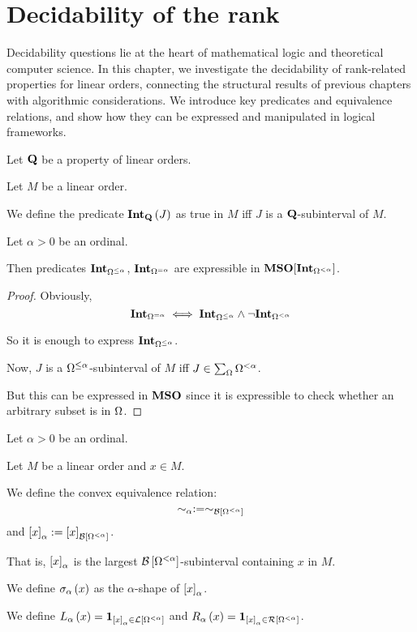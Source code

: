 \section{Decidability of the rank}

Decidability questions lie at the heart of mathematical logic and theoretical computer science. In this chapter, we investigate the decidability of rank-related properties for linear orders, connecting the structural results of previous chapters with algorithmic considerations. We introduce key predicates and equivalence relations, and show how they can be expressed and manipulated in logical frameworks.

\begin{definition}
  Let $\mathbf{Q}$ be a property of linear orders.

  Let $M$ be a linear order.

  We define the predicate $\mathbf{Int}_{\mathbf{Q}} \left( {J} \right)$ as
  true in $M$ iff $J$ is a $\mathbf{Q}$-subinterval of $M$.
\end{definition}

\begin{lemma}
  Let $\alpha > 0$ be an ordinal.

  Then predicates $\mathbf{Int}_{\Omega^{\le \alpha}}$, $\mathbf{Int}_{\Omega^{= \alpha}}$
  are expressible in $\mathbf{MSO}[\mathbf{Int}_{\Omega^{< \alpha}}]$.
\end{lemma}

\begin{proof}
  Obviously, \[
    \mathbf{Int}_{\Omega^{= \alpha}}
    \iff \mathbf{Int}_{\Omega^{\le \alpha}} \wedge \neg \mathbf{Int}_{\Omega^{< \alpha}}
  \]

  So it is enough to express $\mathbf{Int}_{\Omega^{\le \alpha}}$.

  Now, $J$ is a $\Omega^{\le \alpha}$-subinterval of $M$ iff
  $J \in \sum_{\Omega}{\Omega^{< \alpha}}$.

  But this can be expressed in $\mathbf{MSO}$ since it is expressible
  to check whether an arbitrary subset is in $\Omega$.
\end{proof}

\begin{definition}
  Let $\alpha > 0$ be an ordinal.

  Let $M$ be a linear order and $x \in M$.

  We define the convex equivalence relation:
  \[\sim_\alpha := \sim_{\mathcal{B} \left[ {{\Omega^{< \alpha}}} \right]}\]
  and $\left[ {x} \right]_{\alpha} := \left[ {x} \right]_{\mathcal{B} \left[ {{\Omega^{< \alpha}}} \right]}$.

  That is,
  $\left[ {x} \right]_{\alpha}$ is the largest $\mathcal{B} \left[ {{\Omega^{< \alpha}}} \right]$-subinterval
  containing $x$ in $M$.

  We define $\sigma_{\alpha} \left( {x} \right)$ as
  the $\alpha$-shape of $\left[ {x} \right]_{\alpha}$.

  We define
  $L_{\alpha} \left( {x} \right) = \mathbf{1}_{\left[ {x} \right]_{\alpha} \in \mathcal{L} \left[ {{\Omega^{< \alpha}}} \right]}$ and
  $R_{\alpha} \left( {x} \right) = \mathbf{1}_{\left[ {x} \right]_{\alpha} \in \mathcal{R} \left[ {{\Omega^{< \alpha}}} \right]}$.
\end{definition}

